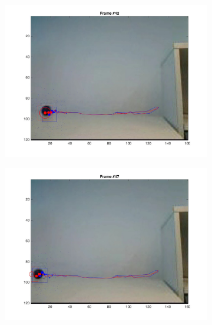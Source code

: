 \documentclass{ethz_report}
\begin{document}
\begin{figure}[h]
\begin{subfigure}[b]{.25\textwidth}
        \includegraphics[width=1\linewidth]{images/video3_observe_low_41}
    \end{subfigure}%
    \begin{subfigure}[b]{.25\textwidth}
        \centering
        \includegraphics[width=1\linewidth]{images/video3_observe_low_46}
    \end{subfigure}%
    \begin{subfigure}[b]{.25\textwidth}
        \centering

\end{subfigure}
\end{figure}
\end{document}
